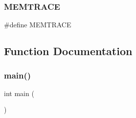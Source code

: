 \subsubsection{M\+E\+M\+T\+R\+A\+CE}
{\footnotesize\ttfamily \#define M\+E\+M\+T\+R\+A\+CE}



\subsection{Function Documentation}
\mbox{\label{main_8cpp_ae66f6b31b5ad750f1fe042a706a4e3d4}} 
\subsubsection{main()}
{\footnotesize\ttfamily int main (\begin{DoxyParamCaption}{ }\end{DoxyParamCaption})}

